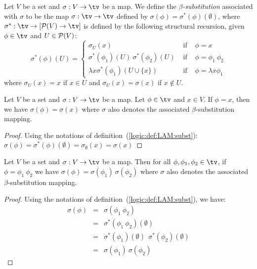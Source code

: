 \begin{defin}\label{logic:def:LAM:subst}
Let $V$ be  a set and $\sigma :V\to \tv$ be a map. We define the
{\em $\beta$-substitution} associated with
$\sigma$ to be the map $\sigma:\tv\to\tv$ defined by
$\sigma(\phi)=\sigma^{*}(\phi)(\emptyset)$, where
$\sigma^{*}:\tv\to[{\cal P}(V)\to\tv]$ is defined by the following structural
recursion, given $\phi\in\tv$ and $U\in{\cal P}(V)$:
    \begin{equation}\label{logic:eqn:LAM:subst:1}
                    \sigma^{*}(\phi)(U)=\left\{
                    \begin{array}{lcl}
                    \sigma_{U}(x)&\mbox{\ if\ }&\phi=x\\
                    \sigma^{*}(\phi_{1})(U)\ \sigma^{*}(\phi_{2})(U)
                    &\mbox{\ if\ }&\phi=\phi_{1}\ \phi_{2}\\
                    \lambda x\sigma^{*}(\phi_{1})(U\cup\{x\})&
                    \mbox{\ if\ }&\phi=\lambda x\phi_{1}
                    \end{array}\right.
    \end{equation}
where $\sigma_{U}(x)=x$ if $x\in U$ and
$\sigma_{U}(x)=\sigma(x)$ if $x\not\in U$.
\end{defin}

\begin{prop}\label{logic:prop:LAM:subst:x}
Let $V$ be a set and $\sigma:V\to\tv$ be a map. Let $\phi\in\tv$ and $x\in V$. 
If $\phi = x$, then  we have $\sigma(\phi) = \sigma(x)$ where $\sigma$ also 
denotes the associated $\beta$-substitution mapping.
\end{prop}
\begin{proof}
    Using the notations of definition~(\ref{logic:def:LAM:subst}):
    $\sigma(\phi) = \sigma^{*}(\phi)(\emptyset) = \sigma_{\emptyset}(x)
    =\sigma(x)$
\end{proof}
\begin{prop}\label{logic:prop:LAM:subst:app}
    Let $V$ be a set and $\sigma:V\to\tv$ be a map. 
    Then for all  $\phi,\phi_{1},\phi_{2}\in\tv$, if $\phi = \phi_{1}\ \phi_{2}$
    we have $\sigma(\phi) = \sigma(\phi_{1})\ \sigma(\phi_{2})$ 
    where $\sigma$ also denotes the associated $\beta$-substitution mapping.
\end{prop}
\begin{proof}
    Using the notations of definition~(\ref{logic:def:LAM:subst}), we have:
        \begin{eqnarray*}
            \sigma(\phi)&=&\sigma(\phi_{1}\ \phi_{2})\\
            &=&\sigma^{*}(\phi_{1}\ \phi_{2})(\emptyset)\\
            &=&\sigma^{*}(\phi_{1})(\emptyset)\ \ \sigma^{*}(\phi_{2})(\emptyset)\\
            &=&\sigma(\phi_{1})\ \sigma(\phi_{2})
        \end{eqnarray*}
\end{proof}


